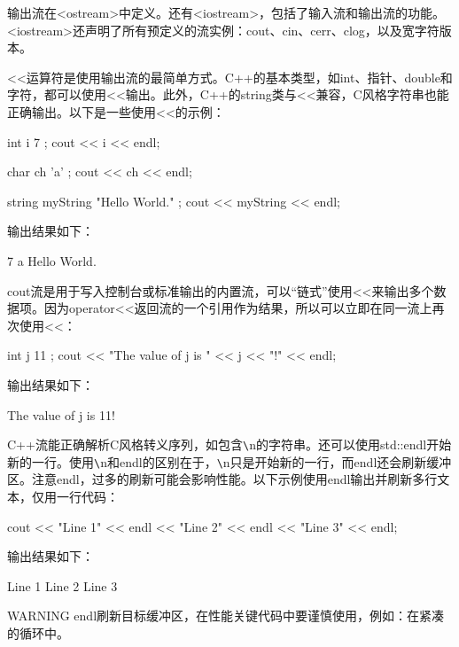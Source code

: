 
输出流在<ostream>中定义。还有<iostream>，包括了输入流和输出流的功能。<iostream>还声明了所有预定义的流实例：cout、cin、cerr、clog，以及宽字符版本。

<{}<运算符是使用输出流的最简单方式。C++的基本类型，如int、指针、double和字符，都可以使用<{}<输出。此外，C++的string类与<{}<兼容，C风格字符串也能正确输出。以下是一些使用<{}<的示例：

\begin{cpp}
int i { 7 };
cout << i << endl;

char ch { 'a' };
cout << ch << endl;

string myString { "Hello World." };
cout << myString << endl;
\end{cpp}

输出结果如下：

\begin{shell}
7
a
Hello World.
\end{shell}

cout流是用于写入控制台或标准输出的内置流，可以“链式”使用<{}<来输出多个数据项。因为operator<{}<返回流的一个引用作为结果，所以可以立即在同一流上再次使用<{}<：

\begin{cpp}
int j { 11 };
cout << "The value of j is " << j << "!" << endl;
\end{cpp}

输出结果如下：

\begin{shell}
The value of j is 11!
\end{shell}

C++流能正确解析C风格转义序列，如包含\verb|\|n的字符串。还可以使用std::endl开始新的一行。使用\verb|\|n和endl的区别在于，\verb|\|n只是开始新的一行，而endl还会刷新缓冲区。注意endl，过多的刷新可能会影响性能。以下示例使用endl输出并刷新多行文本，仅用一行代码：

\begin{cpp}
cout << "Line 1" << endl << "Line 2" << endl << "Line 3" << endl;
\end{cpp}

输出结果如下：

\begin{shell}
Line 1
Line 2
Line 3
\end{shell}

\begin{myWarning}{WARNING}
endl刷新目标缓冲区，在性能关键代码中要谨慎使用，例如：在紧凑的循环中。
\end{myWarning}

